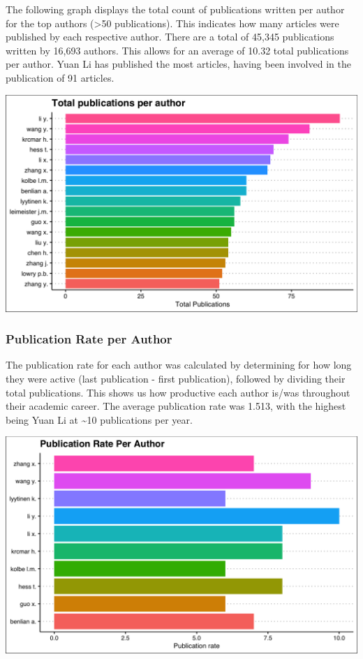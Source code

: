 \documentclass[
  letterpaper,
  DIV=11,
  numbers=noendperiod]{scrartcl}
\begin{document}
The following graph displays the total count of publications written per
author for the top authors (\textgreater50 publications). This indicates
how many articles were published by each respective author. There are a
total of 45,345 publications written by 16,693 authors. This allows for
an average of 10.32 total publications per author. Yuan Li has published
the most articles, having been involved in the publication of 91
articles.

\includegraphics{images/pub_per_auth-01.png}

\hypertarget{publication-rate-per-author}{%
\subsubsection{Publication Rate per
Author}\label{publication-rate-per-author}}

The publication rate for each author was calculated by determining for
how long they were active (last publication - first publication),
followed by dividing their total publications. This shows us how
productive each author is/was throughout their academic career. The
average publication rate was 1.513, with the highest being Yuan Li at
\textasciitilde10 publications per year.

\includegraphics{images/pub_rate-01.png}
\end{document}
